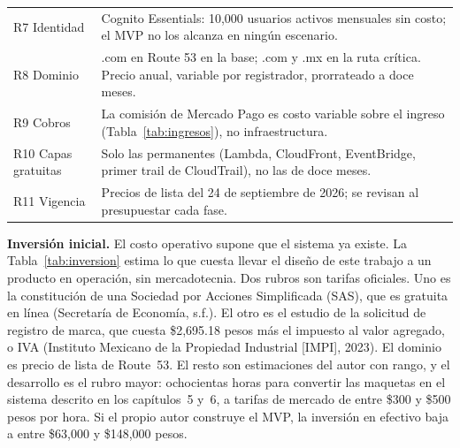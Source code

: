 \documentclass[12pt, a4paper]{article}
\begin{document}
\begin{table}[!htbp]
\begin{tabularx}{\textwidth}{l X}
    R7 Identidad & Cognito Essentials: 10,000 usuarios activos mensuales sin costo; el MVP no los alcanza en ningún escenario. \\
    R8 Dominio & .com en Route 53 en la base; .com y .mx en la ruta crítica. Precio anual, variable por registrador, prorrateado a doce meses. \\
    R9 Cobros & La comisión de Mercado Pago es costo variable sobre el ingreso (Tabla~\ref{tab:ingresos}), no infraestructura. \\
    R10 Capas gratuitas & Solo las permanentes (Lambda, CloudFront, EventBridge, primer trail de CloudTrail), no las de doce meses. \\
    R11 Vigencia & Precios de lista del 24 de septiembre de 2026; se revisan al presupuestar cada fase. \\
    \bottomrule
  \end{tabularx}
\end{table}
 
\textbf{Inversión inicial.} El costo operativo supone que el sistema ya
existe. La Tabla~\ref{tab:inversion} estima lo que cuesta llevar el
diseño de este trabajo a un producto en operación, sin mercadotecnia.
Dos rubros son tarifas oficiales. Uno es la constitución de una Sociedad
por Acciones Simplificada (SAS), que es gratuita en línea (Secretaría de
Economía, s.f.). El otro es el estudio de la solicitud de registro de
marca, que cuesta \$2,695.18 pesos más el impuesto al valor agregado, o
IVA (Instituto Mexicano de la Propiedad Industrial [IMPI], 2023). El
dominio es precio de lista de Route~53. El resto son estimaciones del
autor con rango, y el desarrollo es el rubro mayor: ochocientas horas
para convertir las maquetas en el sistema descrito en los capítulos~5
y~6, a tarifas de mercado de entre \$300 y \$500 pesos por hora. Si el
propio autor construye el MVP, la inversión en efectivo baja a entre
\$63,000 y \$148,000 pesos.
 
\end{document}
